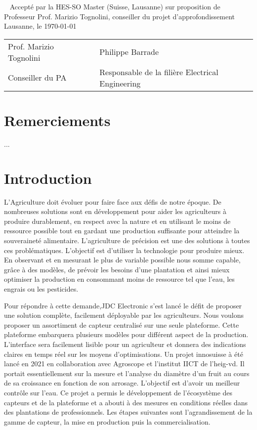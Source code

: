 \documentclass[a4paper, french, 10pt]{article} %
\newcommand{\prof}{Prof. Marizio Tognolini}
\begin{document}


\newpage
\thispagestyle{empty}
\
\newpage
\thispagestyle{empty}
Accepté par la HES-SO Master (Suisse, Lausanne) sur proposition de\\[10pt]
Professeur \prof, conseiller du projet d'approfondissement\\[30pt]
Lausanne, le \today\\[40pt]

\begin{tabular}{lll}
\prof & \hspace{4cm} & Philippe Barrade\\
Conseiller du PA & \hspace{4cm} & Responsable de la filière Electrical Engineering\\
\end{tabular}

\newpage
\thispagestyle{empty}
\section*{Remerciements}
...

\newpage
\thispagestyle{empty}
\tableofcontents

\newpage

\section{Introduction}
L'Agriculture doit évoluer pour faire face aux défis de notre époque. De nombreuses solutions sont en développement pour aider les agriculteurs à produire durablement, en respect avec la nature et en utilisant le moins de ressource possible tout en gardant une production suffisante pour atteindre la souveraineté alimentaire. L'agriculture de précision est une des solutions à toutes ces problématiques. L'objectif est d'utiliser la technologie pour produire mieux. En observant et en mesurant le plus de variable possible nous somme capable, grâce à des modèles, de prévoir les besoins d'une plantation et ainsi mieux optimiser la production en consommant moins de ressource tel que l'eau, les engrais ou les pesticides. 

Pour répondre à cette demande,JDC Electronic s'est lancé le défit de proposer une solution complète, facilement déployable par les agriculteurs. Nous voulons proposer un assortiment de capteur centralisé sur une seule plateforme. Cette plateforme embarquera plusieurs modèles pour différent aspect de la production. L'interface sera facilement lisible pour un agriculteur et donnera des indications claires en temps réel sur les moyens d’optimisations. Un projet innosuisse à été lancé en 2021 en collaboration avec Agroscope et l'institut IICT de l'heig-vd. Il portait essentiellement sur la mesure et l'analyse du diamètre d'un fruit au cours de sa croissance en fonction de son arrosage. L'objectif est d'avoir un meilleur contrôle sur l'eau. Ce projet a permis le développement de l'écosystème des capteurs et de la plateforme et a abouti à des mesures en conditions réelles dans des plantations de professionnels. Les étapes suivantes sont l’agrandissement de la gamme de capteur, la mise en production puis la commercialisation.
\end{document}
